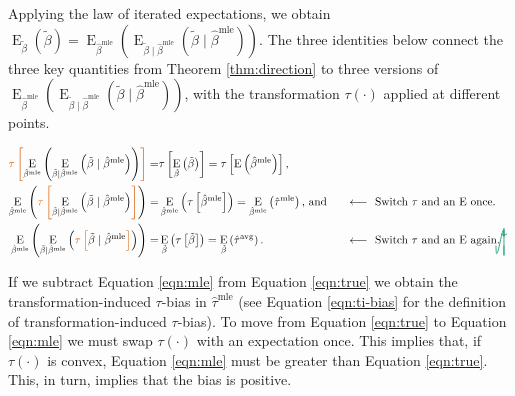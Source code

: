 \documentclass[11pt]{article}
\DeclareMathOperator*{\E}{\text{E}}
\newcommand{\tikzmark}[1]{\tikz[overlay,remember picture] \node (#1) {};}
\newcommand{\DrawBox}[2]{%
  \begin{tikzpicture}[overlay,remember picture]
    \draw[->,shorten >= 6pt, shorten <= 2pt, out=-90, in=90, distance=1.2cm, color2, thick] (MarkA.east) to (MarkB.east);
    \draw[->,shorten >= 6pt, shorten <= 2pt, out=-90, in=90, distance=1cm, color2, thick] (MarkC.west) to (MarkD.east);
  \end{tikzpicture}
}
\newcommand{\justif}[2]{&{#1}&\text{#2}}
\begin{document}
Applying the law of iterated expectations, we obtain $\E_{\tilde{\beta}} \left( \tilde{\beta} \right) = \E_{\hat{\beta}^\text{mle}}\left( \E_{\tilde{\beta} \mid \hat{\beta}^\text{mle}} (\tilde{\beta} \mid \hat{\beta}^\text{mle}) \right)$.
The three identities below connect the three key quantities from Theorem \ref{thm:direction} to three versions of $\E_{\hat{\beta}^\text{mle}}\left( \E_{\tilde{\beta} \mid \hat{\beta}^\text{mle}} (\tilde{\beta} \mid \hat{\beta}^\text{mle}) \right)$, with the transformation $\tau(\cdot)$ applied at different points.

\begin{alignat}{2}
 \color{color1} \tikzmark{MarkA}\tau \left[ \normalcolor \E_{\hat{\beta}^\text{mle}}\left( \E_{\tilde{\beta} \mid \hat{\beta}^\text{mle}} \left( \tilde{\beta} \mid \hat{\beta}^\text{mle} \right) \right) \color{color1} \right] \normalcolor =&  \tau \left[ \E_{\tilde{\beta}} \left( \tilde{\beta} \right) \right] = \tau \left[\E \left( \hat{\beta}^\text{mle} \right) \right]\text{,} \label{eqn:true}\\
 \E_{\hat{\beta}^\text{mle}}\left( \color{color1} \tikzmark{MarkB}\tau\tikzmark{MarkC} \left[ \normalcolor \E_{\tilde{\beta} \mid \hat{\beta}^\text{mle}} \left( \tilde{\beta} \mid \hat{\beta}^\text{mle} \right) \color{color1} \right] \normalcolor \right)  =&  \E_{\hat{\beta}^\text{mle}} \left( \tau \left[\hat{\beta}^\text{mle} \right] \right) =  \E_{\hat{\beta}^\text{mle}} \left(\hat{\tau}^\text{mle} \right) \text{, and} \justif{\quad}{$\longleftarrow~$ Switch $\tau$ and an $\E$ once.} \label{eqn:mle}\\
\E_{\hat{\beta}^\text{mle}}\left( \E_{\tilde{\beta} \mid \hat{\beta}^\text{mle}} \left( \color{color1} \tikzmark{MarkD}\tau \left[ \normalcolor \tilde{\beta} \mid \hat{\beta}^\text{mle} \color{color1} \right] \normalcolor \right) \right)  =&
\E_{\tilde{\beta}} \left( \tau \left[\tilde{\beta} \right] \right)  =
\E_{\tilde{\beta}} \left(\hat{\tau}^\text{avg} \right) \text{.}\justif{\quad}{$\longleftarrow~$ Switch $\tau$ and an $\E$ again.}\label{eqn:avg}\DrawBox{red}{blue}
\end{alignat}

If we subtract Equation \ref{eqn:mle} from Equation \ref{eqn:true} we obtain the transformation-induced $\tau$-bias in $\hat{\tau}^\text{mle}$ (see Equation \ref{eqn:ti-bias} for the definition of transformation-induced $\tau$-bias).
To move from Equation \ref{eqn:true} to Equation \ref{eqn:mle} we must swap $\tau(\cdot)$ with an expectation once.
This implies that, if $\tau(\cdot)$ is convex, Equation \ref{eqn:mle} must be greater than Equation \ref{eqn:true}.
This, in turn, implies that the bias is positive.
\end{document}
